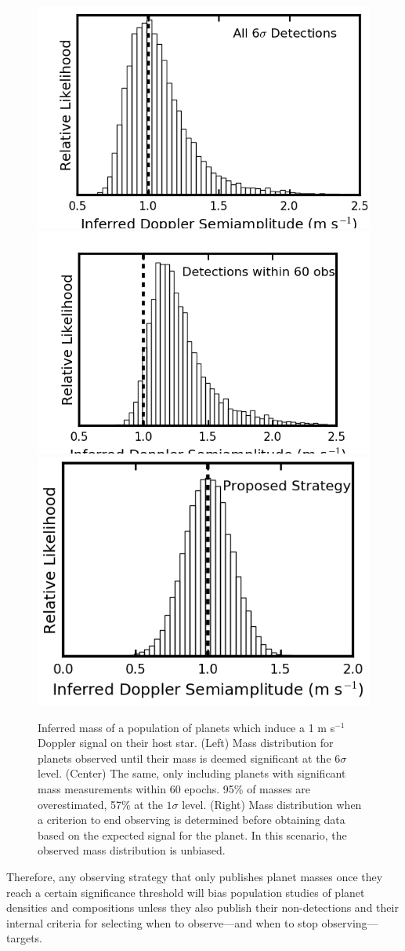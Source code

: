 \documentclass[rnaas]{aastex62}
\begin{document}
\begin{figure}[htp]

\centering
\includegraphics[width=.3\textwidth]{f1.png}\hfill
\includegraphics[width=.3\textwidth]{f2.png}\hfill
\includegraphics[width=.3\textwidth]{f3.png}

\caption{Inferred mass of a population of planets which induce a 1 m s$^{-1}$ Doppler signal on their host star. (Left) Mass distribution for planets observed until their mass is deemed significant at the $6\sigma$ level. (Center) The same, only including planets with significant mass measurements within 60 epochs. 95\% of masses are overestimated, 57\% at the $1\sigma$ level. (Right) Mass distribution when a criterion to end observing is determined before obtaining data based on the expected signal for the planet. In this scenario, the observed mass distribution is unbiased.}
\label{fig}

\end{figure}

Therefore, any observing strategy that only publishes planet masses once they reach a certain significance threshold will bias population studies of planet densities and compositions unless they also publish their non-detections and their internal criteria for selecting when to observe---and when to stop observing---targets.
\end{document}
